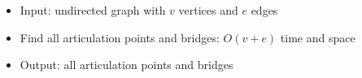\begin{itemize}
	\item Input: undirected graph with $v$ vertices and $e$ edges
	\item Find all articulation points and bridges: $O(v+e)$ time and space
	\item Output: all articulation points and bridges
\end{itemize}